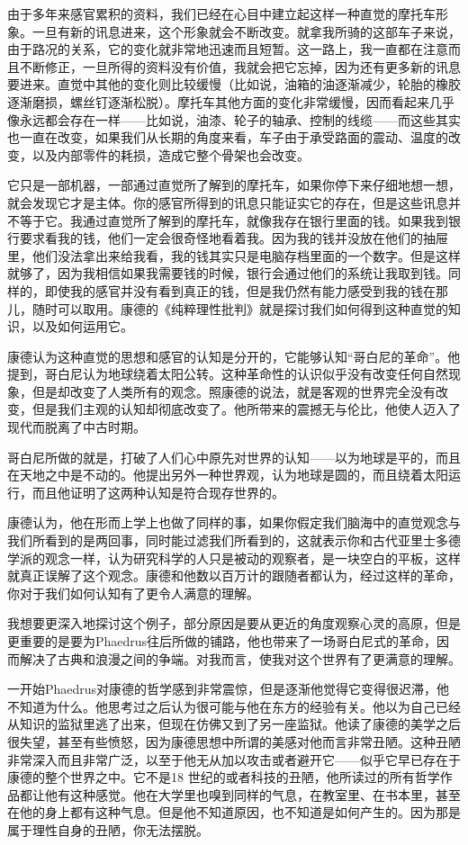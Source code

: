 \documentclass[UTF8]{article}
\begin{document}
\par 由于多年来感官累积的资料，我们已经在心目中建立起这样一种直觉的摩托车形象。一旦有新的讯息进来，这个形象就会不断改变。就拿我所骑的这部车子来说，由于路况的关系，它的变化就非常地迅速而且短暂。这一路上，我一直都在注意而且不断修正，一旦所得的资料没有价值，我就会把它忘掉，因为还有更多新的讯息要进来。直觉中其他的变化则比较缓慢（比如说，油箱的油逐渐减少，轮胎的橡胶逐渐磨损，螺丝钉逐渐松脱）。摩托车其他方面的变化非常缓慢，因而看起来几乎像永远都会存在一样——比如说，油漆、轮子的轴承、控制的线缆——而这些其实也一直在改变，如果我们从长期的角度来看，车子由于承受路面的震动、温度的改变，以及内部零件的耗损，造成它整个骨架也会改变。
\par 它只是一部机器，一部通过直觉所了解到的摩托车，如果你停下来仔细地想一想，就会发现它才是主体。你的感官所得到的讯息只能证实它的存在，但是这些讯息并不等于它。我通过直觉所了解到的摩托车，就像我存在银行里面的钱。如果我到银行要求看我的钱，他们一定会很奇怪地看着我。因为我的钱并没放在他们的抽屉里，他们没法拿出来给我看，我的钱其实只是电脑存档里面的一个数字。但是这样就够了，因为我相信如果我需要钱的时候，银行会通过他们的系统让我取到钱。同样的，即使我的感官并没有看到真正的钱，但是我仍然有能力感受到我的钱在那儿，随时可以取用。康德的《纯粹理性批判》就是探讨我们如何得到这种直觉的知识，以及如何运用它。
\par 康德认为这种直觉的思想和感官的认知是分开的，它能够认知“哥白尼的革命”。他提到，哥白尼认为地球绕着太阳公转。这种革命性的认识似乎没有改变任何自然现象，但是却改变了人类所有的观念。照康德的说法，就是客观的世界完全没有改变，但是我们主观的认知却彻底改变了。他所带来的震撼无与伦比，他使人迈入了现代而脱离了中古时期。
\par 哥白尼所做的就是，打破了人们心中原先对世界的认知——以为地球是平的，而且在天地之中是不动的。他提出另外一种世界观，认为地球是圆的，而且绕着太阳运行，而且他证明了这两种认知是符合现存世界的。
\par 康德认为，他在形而上学上也做了同样的事，如果你假定我们脑海中的直觉观念与我们所看到的是两回事，同时能过滤我们所看到的，这就表示你和古代亚里士多德学派的观念一样，认为研究科学的人只是被动的观察者，是一块空白的平板，这样就真正误解了这个观念。康德和他数以百万计的跟随者都认为，经过这样的革命，你对于我们如何认知有了更令人满意的理解。
\par 我想要更深入地探讨这个例子，部分原因是要从更近的角度观察心灵的高原，但是更重要的是要为Phaedrus往后所做的铺路，他也带来了一场哥白尼式的革命，因而解决了古典和浪漫之间的争端。对我而言，使我对这个世界有了更满意的理解。
\par 一开始Phaedrus对康德的哲学感到非常震惊，但是逐渐他觉得它变得很迟滞，他不知道为什么。他思考过之后认为很可能与他在东方的经验有关。他以为自己已经从知识的监狱里逃了出来，但现在仿佛又到了另一座监狱。他读了康德的美学之后很失望，甚至有些愤怒，因为康德思想中所谓的美感对他而言非常丑陋。这种丑陋非常深入而且非常广泛，以至于他无从加以攻击或者避开它——似乎它早已存在于康德的整个世界之中。它不是18 世纪的或者科技的丑陋，他所读过的所有哲学作品都让他有这种感觉。他在大学里也嗅到同样的气息，在教室里、在书本里，甚至在他的身上都有这种气息。但是他不知道原因，也不知道是如何产生的。因为那是属于理性自身的丑陋，你无法摆脱。
\end{document}

